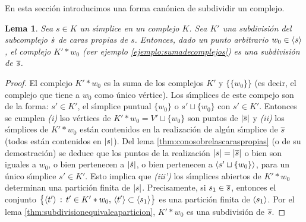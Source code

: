 \theoremstyle{plain}
\newtheorem{lemaSubdividirUnSimplice}{Lema}[section]
\newtheorem{propoBaricentricaEsSubdivision}[lemaSubdividirUnSimplice]%
	{Porposici\'{o}n}
\newtheorem{propoSubcomplejoEsRetracto}[lemaSubdividirUnSimplice]%
	{Porposici\'{o}n}

\theoremstyle{remark}
\newtheorem{obsBaricentricaDeSubcomplejoEsPlena}[lemaSubdividirUnSimplice]%
	{Observaci\'{o}n}


En esta secci\'{o}n introducimos una forma can\'{o}nica de subdividir un
complejo.

\begin{lemaSubdividirUnSimplice}\label{thm:subdividirunsimplice}
	Sea $s\in K$ un s\'{\i}mplice en un complejo $K$. Sea $K'$ una
	subdivisi\'{o}n del subcomplejo $\dot{s}$ de caras propias de $s$.
	Entonces, dado un punto arbitrario $w_{0}\in\langle s\rangle$,
	el complejo $K'*w_{0}$ (ver ejemplo \ref{ejemplo:sumadecomplejos}) es
	una subdivisi\'{o}n de $\overline{s}$.
\end{lemaSubdividirUnSimplice}

\begin{proof}
	El complejo $K'*w_{0}$ es la suma de los complejos $K'$ y
	$\{\{w_{0}\}\}$ (es decir, el complejo que tiene a $w_{0}$ como
	\'{u}nico v\'{e}rtice). Los s\'{\i}mplices de este compejo son de la
	forma: $s'\in K'$, el s\'{\i}mplice puntual $\{w_{0}\}$ o
	$s'\sqcup\{w_{0}\}$ con $s'\in K'$. Entonces se cumplen \emph{(i)}
	lso v\'{e}rtices de $K'* w_{0}=V'\sqcup\{w_{0}\}$ son puntos de
	$\left|\overline{s}\right|$ y \emph{(ii)} los s\'{\i}mplices de $K'*w_{0}$
	est\'{a}n contenidos en la realizaci\'{o}n de alg\'{u}n s\'{\i}mplice
	de $\overline{s}$ (todos est\'{a}n contenidos en $\left|s\right|$). Del lema
	\ref{thm:conosobrelascaraspropias} (o de su demostraci\'{o}n) se
	deduce que los puntos de la realizaci\'{o}n
	$\left|s\right|=\left|\overline{s}\right|$ o bien son iguales a $w_{0}$, o bien
	pertenecen a $\left|\dot{s}\right|$, o bien pertenecen a
	$\langle s'\sqcup\{w_{0}\}\rangle$, para un \'{u}nico s\'{\i}mplice
	$s'\in K'$. Esto implica que \emph{(iii')} los s\'{\i}mplices
	abiertos de $K'*w_{0}$ determinan una partici\'{o}n finita de
	$\left|s\right|$. Precisamente, si $s_{1}\in\overline{s}$, entonces el conjunto
	\begin{math}
		\big\{\langle t'\rangle\,:\,t'\in K'*w_{0},\,
			\langle t'\rangle\subset\langle s_{1}\rangle\big\}
	\end{math}
	es una partici\'{o}n finita de $\langle s_{1}\rangle$. Por el lema
	\ref{thm:subdivisionequivaleaparticion}, $K'*w_{0}$ es una
	subdivisi\'{o}n de $\overline{s}$.
\end{proof}

